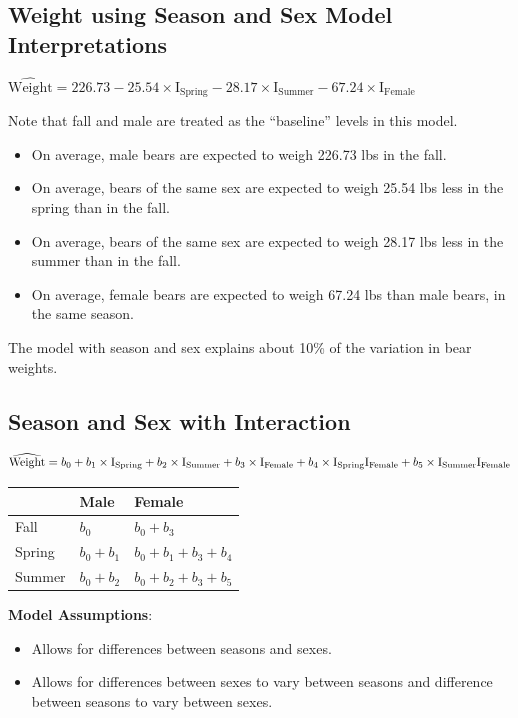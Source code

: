 \documentclass[]{book}
\providecommand{\tightlist}{%
  \setlength{\itemsep}{0pt}\setlength{\parskip}{0pt}}
\begin{document}
\subsection{Weight using Season and Sex Model
Interpretations}\label{weight-using-season-and-sex-model-interpretations}

\(\widehat{\text{Weight}} = 226.73-25.54 \times\text{I}_{\text{Spring}}-28.17\times\text{I}_{\text{Summer}} -67.24\times\text{I}_{\text{Female}}\)

Note that fall and male are treated as the ``baseline'' levels in this
model.

\begin{itemize}
\item
  On average, male bears are expected to weigh 226.73 lbs in the fall.
\item
  On average, bears of the same sex are expected to weigh 25.54 lbs less
  in the spring than in the fall.
\item
  On average, bears of the same sex are expected to weigh 28.17 lbs less
  in the summer than in the fall.
\item
  On average, female bears are expected to weigh 67.24 lbs than male
  bears, in the same season.
\end{itemize}

The model with season and sex explains about 10\% of the variation in
bear weights.

\subsection{Season and Sex with
Interaction}\label{season-and-sex-with-interaction}

\[\widehat{\text{Weight}} = b_0 + b_1 \times\text{I}_{\text{Spring}} + b_2\times\text{I}_{\text{Summer}} +b_3\times\text{I}_{\text{Female}}\\ +b_4\times\text{I}_{\text{Spring}}\text{I}_{\text{Female}} +b_5\times\text{I}_{\text{Summer}}\text{I}_{\text{Female}}\]

\begin{longtable}[]{@{}lll@{}}
\toprule
& Male & Female\tabularnewline
\midrule
\endhead
Fall & \(b_0\) & \(b_0+b_3\)\tabularnewline
Spring & \(b_0+b_1\) & \(b_0+b_1 +b_3+b_4\)\tabularnewline
Summer & \(b_0+b_2\) & \(b_0+b_2+b_3+b_5\)\tabularnewline
\bottomrule
\end{longtable}

\textbf{Model Assumptions}:

\begin{itemize}
\tightlist
\item
  Allows for differences between seasons and sexes.\\
\item
  Allows for differences between sexes to vary between seasons and
  difference between seasons to vary between sexes.
\end{itemize}
\end{document}

